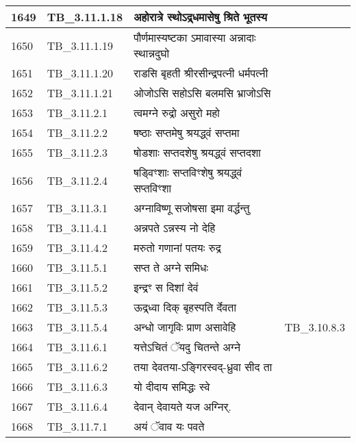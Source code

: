 \documentclass[17pt]{extarticle}
\begin{document}
\begin{longtable}{||p{0.4in}||p{0.9in}||p{4.0in}||p{0.9in}||}
        \hline
            1649 & TB\_3.11.1.18 & अहोरात्रे स्थोऽद्र्धमासेषु श्रिते भूतस्य &      \\
        \hline
            1650 & TB\_3.11.1.19 & पौर्णमास्यष्टका ऽमावास्या अन्नादाः स्थान्नदुघो &      \\
        \hline
            1651 & TB\_3.11.1.20 & राडसि बृहती श्रीरसीन्द्रपत्नी धर्मपत्नी &      \\
        \hline
            1652 & TB\_3.11.1.21 & ओजोऽसि सहोऽसि बलमसि भ्राजोऽसि &      \\
        \hline
            1653 & TB\_3.11.2.1 & त्वमग्ने रुद्रो असुरो महो &      \\
        \hline
            1654 & TB\_3.11.2.2 & षष्ठाः सप्तमेषु श्रयद्ध्वं सप्तमा &      \\
        \hline
            1655 & TB\_3.11.2.3 & षोडशाः सप्तदशेषु श्रयद्ध्वं सप्तदशा &      \\
        \hline
            1656 & TB\_3.11.2.4 & षड्विꣳशाः सप्तविꣳशेषु श्रयद्ध्वं सप्तविꣳशा &      \\
        \hline
            1657 & TB\_3.11.3.1 & अग्नाविष्णू सजोषसा इमा वर्द्धन्तु &      \\
        \hline
            1658 & TB\_3.11.4.1 & अन्नपते ऽन्नस्य नो देहि &      \\
        \hline
            1659 & TB\_3.11.4.2 & मरुतो गणानां पतयः रुद्र &      \\
        \hline
            1660 & TB\_3.11.5.1 & सप्त ते अग्ने समिधः &      \\
        \hline
            1661 & TB\_3.11.5.2 & इन्द्रꣳ स दिशां देवं &      \\
        \hline
            1662 & TB\_3.11.5.3 & ऊद्र्ध्वा दिक् बृहस्पति र्देवता &      \\
        \hline
            1663 & TB\_3.11.5.4 & अन्धो जागृविः प्राण असावेहि & TB\_3.10.8.3        \\
        \hline
            1664 & TB\_3.11.6.1 & यत्तेऽचितं ॅयदु चितन्ते अग्ने &      \\
        \hline
            1665 & TB\_3.11.6.2 & तया देवतया{-}ऽङ्गिरस्वद्{-}ध्रुवा सीद ता &      \\
        \hline
            1666 & TB\_3.11.6.3 & यो दीदाय समिद्धः स्वे &      \\
        \hline
            1667 & TB\_3.11.6.4 & देवान् देवायते यज अग्निर्. &      \\
        \hline
            1668 & TB\_3.11.7.1 & अयं ॅवाव यः पवते &      \\

\end{longtable}
\end{document}
